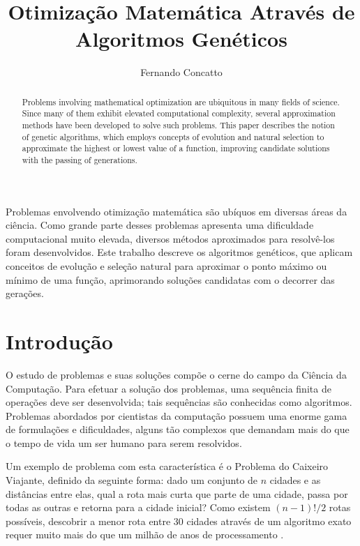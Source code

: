 \documentclass[12pt]{article}
\title{Otimização Matemática Através de Algoritmos Genéticos}
\author{Fernando Concatto\inst{1}}
\begin{document}
\maketitle

\begin{abstract}
  Problems involving mathematical optimization are ubiquitous in many fields of science. Since many of them exhibit elevated computational complexity, several approximation methods have been developed to solve such problems. This paper describes the notion of genetic algorithms, which employs concepts of evolution and natural selection to approximate the highest or lowest value of a function, improving candidate solutions with the passing of generations.
\end{abstract}

\begin{resumo}
  Problemas envolvendo otimização matemática são ubíquos em diversas áreas da ciência. Como grande parte desses problemas apresenta uma dificuldade computacional muito elevada, diversos métodos aproximados para resolvê-los foram desenvolvidos. Este trabalho descreve os algoritmos genéticos, que aplicam conceitos de evolução e seleção natural para aproximar o ponto máximo ou mínimo de uma função, aprimorando soluções candidatas com o decorrer das gerações.
\end{resumo}


\section{Introdução} \label{sec:intro}

O estudo de problemas e suas soluções compõe o cerne do campo da Ciência da Computação. Para efetuar a solução dos problemas, uma sequência finita de operações deve ser desenvolvida; tais sequências são conhecidas como algoritmos. Problemas abordados por cientistas da computação possuem uma enorme gama de formulações e dificuldades, alguns tão complexos que demandam mais do que o tempo de vida um ser humano para serem resolvidos.

Um exemplo de problema com esta característica é o Problema do Caixeiro Viajante, definido da seguinte forma: dado um conjunto de $n$ cidades e as distâncias entre elas, qual a rota mais curta que parte de uma cidade, passa por todas as outras e retorna para a cidade inicial? Como existem $(n-1)!/2$ rotas possíveis, descobrir a menor rota entre 30 cidades através de um algoritmo exato requer muito mais do que um milhão de anos de processamento \cite{MacGregor2011}.
\end{document}
